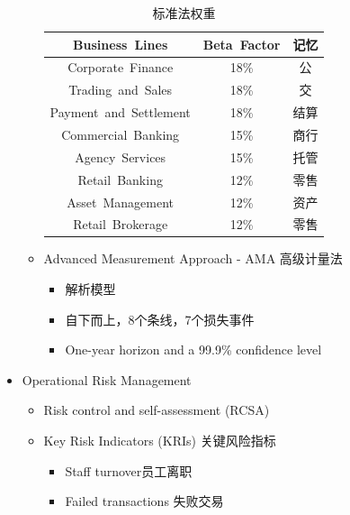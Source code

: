 \documentclass[a4paper,6pt,twoside,openany]{article}
\begin{document}
\begin{itemize}
\begin{itemize}
\begin{itemize}
\begin{itemize}
      \end{itemize}
    \end{itemize}
    \begin{table}[!htbp]
      \centering
      \caption{标准法权重}
      \begin{tabular}{|c|c|c|}  \hline \rowcolor[gray]{0.5} Business\ Lines & Beta\ Factor
        & 记忆 \\ \hline Corporate\ Finance & 18\% & 公 \\ \hline Trading\ and\ Sales &18\% & 交 \\
        \hline Payment\ and\ Settlement &18\% & 结算 \\ \hline Commercial\ Banking & 15\% & 商行 \\
        \hline Agency\ Services &15\% & 托管\\ \hline Retail\ Banking &12\% & 零售\\ \hline Asset\
        Management &12\% & 资产\\ \hline Retail\ Brokerage &12\% & 零售\\ \hline \end{tabular}
    \end{table}
  \item Advanced Measurement Approach - AMA 高级计量法
    \begin{itemize}
    \item 解析模型
    \item 自下而上，8个条线，7个损失事件
    \item One-year horizon and a 99.9\% confidence level
    \end{itemize}
  \end{itemize}
\item Operational Risk Management
  \begin{itemize}
  \item Risk control and self-assessment (RCSA)
  \item Key Risk Indicators (KRIs) 关键风险指标
    \begin{itemize}
    \item Staff turnover员工离职
    \item Failed transactions 失败交易
    \end{itemize}
  \end{itemize}
\end{itemize}
\end{document}
